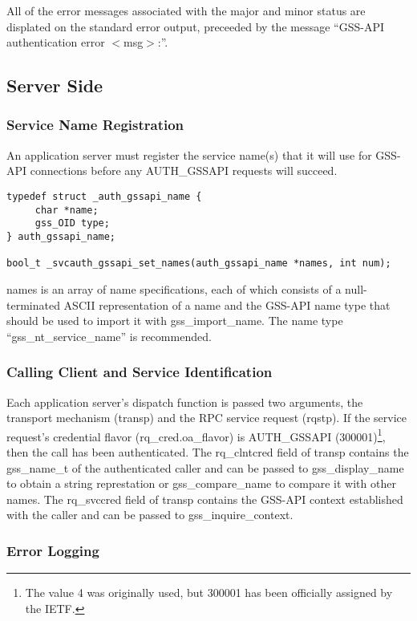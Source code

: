 All of the error messages associated with the major and minor status
are displated on the standard error output, preceeded by the message
``GSS-API authentication error $<$msg$>$:''.

\subsection{Server Side}

\subsubsection{Service Name Registration}

An application server must register the service name(s) that it will
use for GSS-API connections before any AUTH_GSSAPI requests will
succeed.

\begin{verbatim}
typedef struct _auth_gssapi_name {
     char *name;
     gss_OID type;
} auth_gssapi_name;

bool_t _svcauth_gssapi_set_names(auth_gssapi_name *names, int num);
\end{verbatim}

names is an array of name specifications, each of which consists of a
null-terminated ASCII representation of a name and the GSS-API name
type that should be used to import it with gss_import_name.  The
name type ``gss_nt_service_name'' is recommended.

\subsubsection{Calling Client and Service Identification}

Each application server's dispatch function is passed two arguments,
the transport mechanism (transp) and the RPC service request (rqstp).
If the service request's credential flavor (rq_cred.oa_flavor) is
AUTH_GSSAPI (300001)\footnote{The value 4 was originally used, but
300001 has been officially assigned by the IETF.}, then the call has
been authenticated.  The rq_clntcred field of transp contains the
gss_name_t of the authenticated caller and can be passed to
gss_display_name to obtain a string represtation or gss_compare_name
to compare it with other names.  The rq_svccred field of transp
contains the GSS-API context established with the caller and can be
passed to gss_inquire_context.

\subsubsection{Error Logging}

